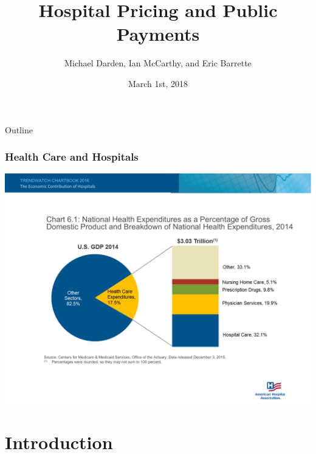 \documentclass[ucs,9pt]{beamer}
\title[Cost-Shifting] %
{Hospital Pricing and Public Payments}
\subtitle
{}
\author[Author] %
{Michael Darden, Ian McCarthy, and Eric Barrette}
\institute[George Washington University] %
{}
\date[3/1/2018] %
{March 1st, 2018}
\begin{document}
\begin{frame}[plain]
  \titlepage
\end{frame}

\begin{frame}{Outline}
  \tableofcontents
\end{frame}
\begin{frame}
\frametitle{Health Care and Hospitals}
\includegraphics[scale=0.62]{6_1}
\end{frame}
\section{Introduction}






\end{document}
